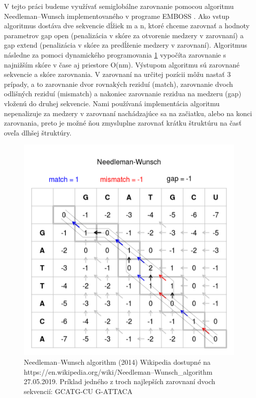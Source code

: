 \indent  V tejto práci budeme využívať semiglobálne zarovnanie pomocou algoritmu Needleman–Wunsch \cite{Needleman70}  implementovaného v programe EMBOSS \cite{Emboss}. Ako vstup algoritmus dostáva dve sekvencie dĺžiek m a n, ktoré chceme zarovnať a hodnoty parametrov gap open (penalizácia v skóre za otvorenie medzery v zarovnaní) a gap extend (penalizácia v skóre za predĺženie medzery v zarovnaní). Algoritmus následne za pomoci dynamického programovania \ref{obr03:aln} vypočíta zarovnanie s najnižším skóre v čase aj priestore O(nm).  Výstupom algoritmu sú zarovnané sekvencie a skóre zarovnania. V zarovnaní na určitej pozícii môžu nastať 3 prípady, a to zarovnanie dvor rovnakých reziduí (match), zarovnanie dvoch odlišných reziduí (mismatch) a nakoniec zarovnanie rezidua na medzeru (gap) vloženú do druhej sekvencie. Nami používaná implementácia algoritmu nepenalizuje za medzery v zarovnaní nachádzajúce sa na začiatku, alebo na konci zarovnania, preto je možné ňou zmysluplne zarovnať krátku štruktúru na časť oveľa dlhšej štruktúry.

\begin{figure}%
\includegraphics[width=\textwidth]{../img/needlemanwunsch}
\caption{Needleman–Wunsch algorithm (2014) Wikipedia dostupné na https://en.wikipedia.org/wiki/Needleman–Wunsch\_algorithm 27.05.2019. Príklad jedného z troch najlepších zarovnaní dvoch sekvencií: \newline GCATG-CU \newline G-ATTACA}
\label{obr03:aln}
\end{figure}


